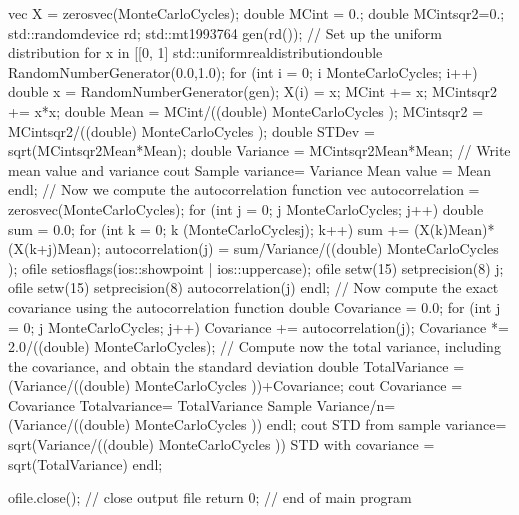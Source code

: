\documentclass[letterpaper,10pt,english]{sphinxmanual}
\begin{document}
\begin{sphinxVerbatim}[commandchars=\\\{\}]
      vec X  = zeros\PYGZlt{}vec\PYGZgt{}(MonteCarloCycles);
      double MCint = 0.;      double MCintsqr2=0.;
      std::random\PYGZus{}device rd;
      std::mt19937\PYGZus{}64 gen(rd());
      // Set up the uniform distribution for x \PYGZbs{}in [[0, 1]
      std::uniform\PYGZus{}real\PYGZus{}distribution\PYGZlt{}double\PYGZgt{} RandomNumberGenerator(0.0,1.0);
      for (int i = 0;  i \PYGZlt{} MonteCarloCycles; i++)\PYGZob{}
        double x =   RandomNumberGenerator(gen); 
        X(i) = x;
        MCint += x;
        MCintsqr2 += x*x;
      \PYGZcb{}
      double Mean = MCint/((double) MonteCarloCycles );
      MCintsqr2 = MCintsqr2/((double) MonteCarloCycles );
      double STDev = sqrt(MCintsqr2\PYGZhy{}Mean*Mean);
      double Variance = MCintsqr2\PYGZhy{}Mean*Mean;
      //   Write mean value and variance
      cout \PYGZlt{}\PYGZlt{} \PYGZdq{} Sample variance= \PYGZdq{} \PYGZlt{}\PYGZlt{} Variance  \PYGZlt{}\PYGZlt{} \PYGZdq{} Mean value = \PYGZdq{} \PYGZlt{}\PYGZlt{} Mean \PYGZlt{}\PYGZlt{} endl;
      // Now we compute the autocorrelation function
      vec autocorrelation = zeros\PYGZlt{}vec\PYGZgt{}(MonteCarloCycles);
      for (int j = 0; j \PYGZlt{} MonteCarloCycles; j++)\PYGZob{}
        double sum = 0.0;
        for (int k = 0; k \PYGZlt{} (MonteCarloCycles\PYGZhy{}j); k++)\PYGZob{}
          sum  += (X(k)\PYGZhy{}Mean)*(X(k+j)\PYGZhy{}Mean); 
        \PYGZcb{}
        autocorrelation(j) = sum/Variance/((double) MonteCarloCycles );
        ofile \PYGZlt{}\PYGZlt{} setiosflags(ios::showpoint | ios::uppercase);
        ofile \PYGZlt{}\PYGZlt{} setw(15) \PYGZlt{}\PYGZlt{} setprecision(8) \PYGZlt{}\PYGZlt{} j;
        ofile \PYGZlt{}\PYGZlt{} setw(15) \PYGZlt{}\PYGZlt{} setprecision(8) \PYGZlt{}\PYGZlt{} autocorrelation(j) \PYGZlt{}\PYGZlt{} endl;
      \PYGZcb{}
      // Now compute the exact covariance using the autocorrelation function
      double Covariance = 0.0;
      for (int j = 0; j \PYGZlt{} MonteCarloCycles; j++)\PYGZob{}
        Covariance  += autocorrelation(j);
      \PYGZcb{}
      Covariance *=  2.0/((double) MonteCarloCycles);
      // Compute now the total variance, including the covariance, and obtain the standard deviation
      double TotalVariance = (Variance/((double) MonteCarloCycles ))+Covariance;
      cout \PYGZlt{}\PYGZlt{} \PYGZdq{}Covariance =\PYGZdq{} \PYGZlt{}\PYGZlt{} Covariance \PYGZlt{}\PYGZlt{} \PYGZdq{}Totalvariance= \PYGZdq{} \PYGZlt{}\PYGZlt{} TotalVariance \PYGZlt{}\PYGZlt{} \PYGZdq{}Sample Variance/n= \PYGZdq{} \PYGZlt{}\PYGZlt{} (Variance/((double) MonteCarloCycles )) \PYGZlt{}\PYGZlt{} endl;
      cout \PYGZlt{}\PYGZlt{} \PYGZdq{} STD from sample variance= \PYGZdq{} \PYGZlt{}\PYGZlt{} sqrt(Variance/((double) MonteCarloCycles )) \PYGZlt{}\PYGZlt{} \PYGZdq{} STD with covariance = \PYGZdq{} \PYGZlt{}\PYGZlt{} sqrt(TotalVariance) \PYGZlt{}\PYGZlt{} endl;
    
      ofile.close();  // close output file
      return 0;
    \PYGZcb{}  // end of main program 
\end{sphinxVerbatim}
\end{document}
